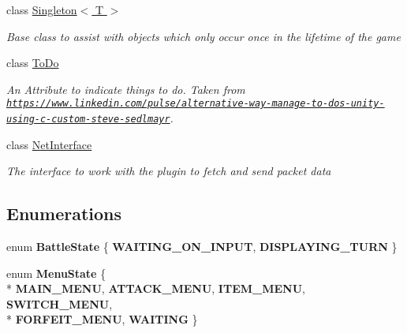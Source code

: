 \begin{DoxyCompactItemize}
class \hyperlink{class_singleton_3_01_t_01_4}{Singleton$<$ T $>$}
\begin{DoxyCompactList}\small\item\em Base class to assist with objects which only occur once in the lifetime of the game \end{DoxyCompactList}\item 
class \hyperlink{class_to_do}{To\-Do}
\begin{DoxyCompactList}\small\item\em An Attribute to indicate things to do. Taken from \href{https://www.linkedin.com/pulse/alternative-way-manage-to-dos-unity-using-c-custom-steve-sedlmayr}{\tt https\-://www.\-linkedin.\-com/pulse/alternative-\/way-\/manage-\/to-\/dos-\/unity-\/using-\/c-\/custom-\/steve-\/sedlmayr}. \end{DoxyCompactList}\item 
class \hyperlink{class_net_interface}{Net\-Interface}
\begin{DoxyCompactList}\small\item\em The interface to work with the plugin to fetch and send packet data \end{DoxyCompactList}\end{DoxyCompactItemize}
\subsection*{Enumerations}
\begin{DoxyCompactItemize}
\item 
enum {\bfseries Battle\-State} \{ {\bfseries W\-A\-I\-T\-I\-N\-G\-\_\-\-O\-N\-\_\-\-I\-N\-P\-U\-T}, 
{\bfseries D\-I\-S\-P\-L\-A\-Y\-I\-N\-G\-\_\-\-T\-U\-R\-N}
 \}
\item 
enum {\bfseries Menu\-State} \{ \\*
{\bfseries M\-A\-I\-N\-\_\-\-M\-E\-N\-U}, 
{\bfseries A\-T\-T\-A\-C\-K\-\_\-\-M\-E\-N\-U}, 
{\bfseries I\-T\-E\-M\-\_\-\-M\-E\-N\-U}, 
{\bfseries S\-W\-I\-T\-C\-H\-\_\-\-M\-E\-N\-U}, 
\\*
{\bfseries F\-O\-R\-F\-E\-I\-T\-\_\-\-M\-E\-N\-U}, 
{\bfseries W\-A\-I\-T\-I\-N\-G}
 \}
\end{DoxyCompactItemize}
